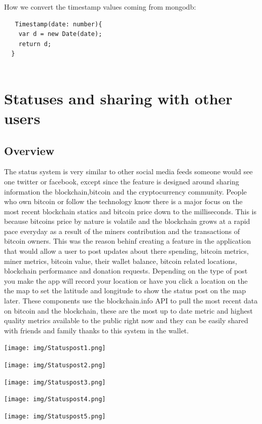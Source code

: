 How we convert the timestamp values coming from mongodb:
\begin{lstlisting}
   Timestamp(date: number){
    var d = new Date(date);
    return d;
  }
  
\end{lstlisting}

\section{Statuses and sharing with other users}

\subsection{Overview}
The status system is very similar to other social media feeds someone would see one twitter or facebook, except since the feature is designed around sharing information the blockchain,bitcoin and the cryptocurrency community. People who own bitcoin or follow the technology know there is a major focus on the most recent blockchain statics and bitcoin price down to the milliseconds. This is because bitcoins price by nature is volatile and the blockchain grows at a rapid pace everyday as a result of the miners contribution and the transactions of bitcoin owners. This was the reason behinf creating a feature in the application that would allow a user to post updates about there spending, bitcoin metrics, miner metrics, bitcoin value, their wallet balance, bitcoin related locations, blockchain performance and donation requests. Depending on the type of post you make the app will record your location or have you click a location on the the map to set the latitude and longitude to show the status post on the map later. These components use the blockchain.info API to pull the most recent data on bitcoin and the blockchain, these are the most up to date metric and highest quality metrics available to the public right now and they can be easily shared with friends and family thanks to this system in the wallet.


\texttt{[image: img/Statuspost1.png]}

\texttt{[image: img/Statuspost2.png]}

\texttt{[image: img/Statuspost3.png]}

\texttt{[image: img/Statuspost4.png]}

\texttt{[image: img/Statuspost5.png]}

